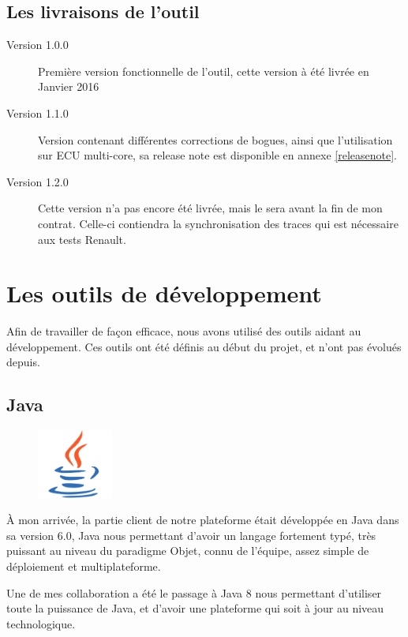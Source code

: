 \subsection{Les livraisons de l'outil}
\begin{description}
\item[Version 1.0.0] Première version fonctionnelle de l'outil, cette version à été livrée en Janvier 2016
\item[Version 1.1.0] Version contenant différentes corrections de bogues, ainsi que l'utilisation sur ECU multi-core, sa release note est disponible en annexe \ref{releasenote}.
\item[Version 1.2.0] Cette version n'a pas encore été livrée, mais le sera avant la fin de mon contrat. Celle-ci contiendra la synchronisation des traces qui est nécessaire aux tests Renault. 
\end{description}


\section{Les outils de développement}
Afin de travailler de façon efficace, nous avons utilisé des outils aidant au développement. Ces outils ont été définis au début du projet, et n'ont pas évolués depuis.
\newpage
\subsection{Java}
\begin{figure}
	\includegraphics[width=2.5cm]{contents/images/logoJava.png}
\end{figure}
À mon arrivée, la partie client de notre plateforme était développée en Java dans sa version 6.0, Java nous permettant d'avoir un langage fortement typé, très puissant au niveau du paradigme Objet, connu de l'équipe, assez simple de déploiement et multiplateforme. 

Une de mes collaboration a été le passage à Java 8 nous permettant d'utiliser toute la puissance de Java, et d'avoir une plateforme qui soit à jour au niveau technologique.

